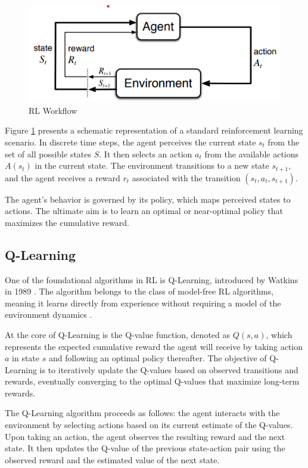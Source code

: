 \begin{figure}[ht]
    \centering
    \includegraphics[scale=1]{images/rl-workflow.png}
    \caption{RL Workflow}
    \label{fig:sutton_rl_workflow}
\end{figure}

Figure \ref{fig:sutton_rl_workflow} presents a schematic representation of a standard reinforcement learning scenario. In discrete time steps, the agent perceives the current state $s_t$ from the set of all possible states $S$. It then selects an action $a_t$ from the available actions $A(s_t)$ in the current state. The environment transitions to a new state $s_{t+1}$, and the agent receives a reward $r_t$ associated with the transition $(s_t, a_t, s_{t+1})$.

The agent's behavior is governed by its policy, which maps perceived states to actions. The ultimate aim is to learn an optimal or near-optimal policy that maximizes the cumulative reward. 


\subsection{Q-Learning}

One of the foundational algorithms in RL is Q-Learning, introduced by Watkins in 1989 \cite{watkins1989learning}. The algorithm belongs to the class of model-free RL algorithms, meaning it learns directly from experience without requiring a model of the environment dynamics \cite{russel2020ai}.

At the core of Q-Learning is the Q-value function, denoted as $Q(s, a)$, which represents the expected cumulative reward the agent will receive by taking action $a$ in state $s$ and following an optimal policy thereafter. The objective of Q-Learning is to iteratively update the Q-values based on observed transitions and rewards, eventually converging to the optimal Q-values that maximize long-term rewards.

The Q-Learning algorithm proceeds as follows: the agent interacts with the environment by selecting actions based on its current estimate of the Q-values. Upon taking an action, the agent observes the resulting reward and the next state. It then updates the Q-value of the previous state-action pair using the observed reward and the estimated value of the next state.

